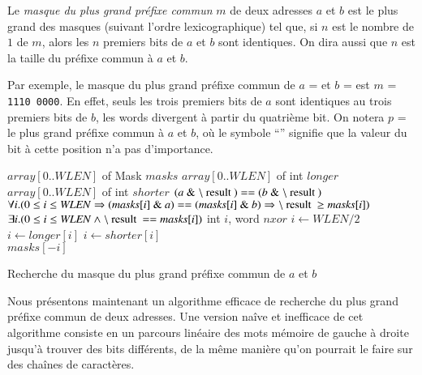 Le {\em masque du plus grand préfixe commun} $m$ de deux adresses $a$ et $b$ est
le plus grand des masques (suivant l'ordre lexicographique) tel que, si $n$ est
le nombre de $1$ de $m$, alors les $n$ premiers bits de $a$ et $b$ sont
identiques.
On dira aussi que $n$ est la taille du préfixe commun à $a$ et $b$.

Par exemple, le masque du plus grand préfixe commun de $a$ =
 et $b$ =  est
$m$ = \texttt{1110\,0000}.
En effet, seuls les trois premiers bits de $a$ sont identiques au trois premiers
bits de $b$, les words divergent à partir du quatrième bit.
On notera $p$ =  le plus grand préfixe commun à $a$
et $b$, où le symbole ``{\tt *}'' signifie que la valeur du bit à cette position
n'a pas d'importance.


\begin{algorithm}
\begin{algorithmic}[1]
\Statex $array[ 0 .. \mathit{WLEN} ]$ of Mask $\mathit{masks}$
\Statex $array[ 0 .. \mathit{WLEN} ]$ of int $\mathit{longer}$
\Statex $array[ 0 .. \mathit{WLEN} ]$ of int $\mathit{shorter}$
\Statex
\Ensure $(a \Band \mresult) == (b \Band \mresult)$
\Ensure $\forall i. (0 \le i \le \mathit{WLEN} \Rightarrow (\mathit{masks}[i] \Band a) == (\mathit{masks}[i] \Band b) \Rightarrow \mresult \ge \mathit{masks}[i])$
\Ensure $\exists i. (0 \le i \le \mathit{WLEN} \land \mresult == \mathit{masks}[i])$
\Statex
{}
\State int $i$, word $nxor$
\State $i \gets \mathit{WLEN}/2$
    \State $i \gets \mathit{longer}[i]$ 
  \Else
    \State $i \gets \mathit{shorter}[i]$
  \EndIf
\EndWhile\\
\Return $masks[-i]$
\EndFunction
\end{algorithmic}
\caption{Recherche du masque du plus grand préfixe commun de $a$ et $b$
  \label{algo:prefix}}
\end{algorithm}


Nous présentons maintenant un algorithme efficace de recherche du plus grand
préfixe commun de deux adresses.
Une version naîve et inefficace de cet algorithme consiste en un parcours
linéaire des mots mémoire de gauche à droite jusqu'à trouver des bits
différents, de la même manière qu'on pourrait le faire sur des chaînes de
caractères.

